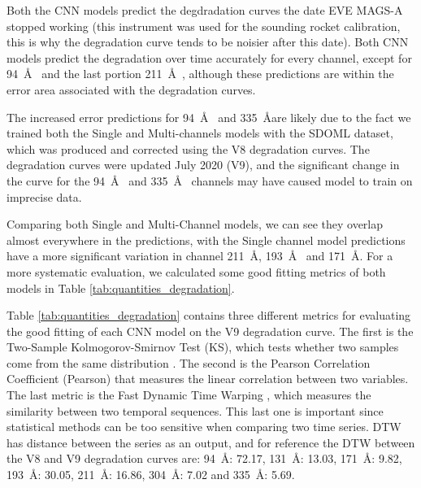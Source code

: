 \documentclass[twocolumn,usenames,dvipsnames]{aastex63}
\begin{document}
Both the CNN models predict the degdradation curves the date EVE MAGS-A stopped working (this instrument was used for the sounding rocket calibration, this is why the degradation curve tends to be noisier after this date). Both CNN models predict the degradation over time accurately for every channel, except for 94~\AA~ and the last portion 211~\AA~, although these predictions are within the error area associated with the degradation curves. 

The increased error predictions for 94~\AA~ and 335~\AA are likely due to the fact we trained both the Single and Multi-channels models with the SDOML dataset, which was produced and corrected using the V8 degradation curves. The degradation curves were updated July 2020 (V9), and the significant change in the curve for the 94~\AA~ and 335~\AA~ channels may have caused model to train on imprecise data.

Comparing both Single and Multi-Channel models, we can see they overlap almost everywhere in the predictions, with the Single channel model predictions have a more significant variation in channel 211~\AA, 193~\AA~ and 171~\AA. For a more systematic evaluation, we calculated some good fitting metrics of both models in Table \ref{tab:quantities_degradation}.

Table \ref{tab:quantities_degradation} contains three different metrics for evaluating the good fitting of each CNN model on the V9 degradation curve. The first is the Two-Sample Kolmogorov-Smirnov Test (KS), which tests whether two samples come from the same distribution \citep{doi:10.1080/01621459.1951.10500769}. The second is the Pearson Correlation Coefficient (Pearson) that measures the linear correlation between two variables. The last metric is the Fast Dynamic Time Warping \citep[DTW, ][]{fastDTW}, which measures the similarity between two temporal sequences. This last one is important since statistical methods can be too sensitive when comparing two time series. DTW has distance between the series as an output, and for reference the DTW between the V8 and V9 degradation curves are: 94~\AA: 72.17, 131~\AA: 13.03, 171~\AA: 9.82, 193~\AA: 30.05, 211~\AA: 16.86, 304~\AA: 7.02 and 335~\AA: 5.69.
\end{document}
